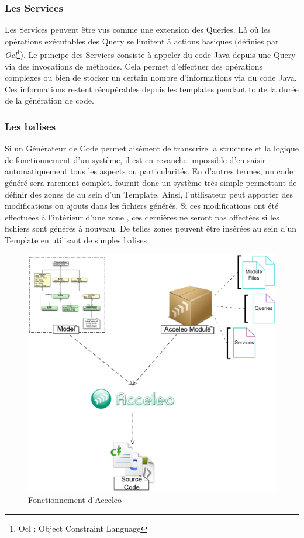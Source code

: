 \subsubsection{Les Services}

Les Services peuvent être vus comme une extension des Queries. Là où les opérations exécutables des Query se limitent à actions basiques (définies par \textit{Ocl}\footnote{Ocl : Object Constraint Language}). Le principe des Services consiste à appeler du code Java depuis une Query via des invocations de méthodes. Cela permet d'effectuer des opérations complexes ou bien de stocker un certain nombre d'informations via du code Java. Ces informations restent récupérables depuis les templates pendant toute la durée de la génération de code.

\subsubsection{Les balises }

Si un Générateur de Code permet aisément de transcrire la structure et la logique de fonctionnement d'un système, il est en revanche impossible d'en saisir automatiquement tous les aspects ou particularités. En d'autres termes, un code généré sera rarement complet. \kwacceleo fournit donc un système très simple permettant de définir des zones de  au sein d'un Template. Ainsi, l'utilisateur peut apporter des modifications ou ajouts dans les fichiers générés. Si ces modifications ont été effectuées à l'intérieur d'une zone , ces dernières ne seront pas affectées si les fichiers sont générés à nouveau. De telles zones peuvent être insérées au sein d'un Template en utilisant de simples balises \guim{\textit{\textbf{[protected]}}}

\begin{figure}[htb]
  \centering
  \includegraphics[scale=0.29]{img/acceleo_scheme.eps}
  \caption{Fonctionnement d'Acceleo}
  \label{fig:acceleo}
\end{figure}

